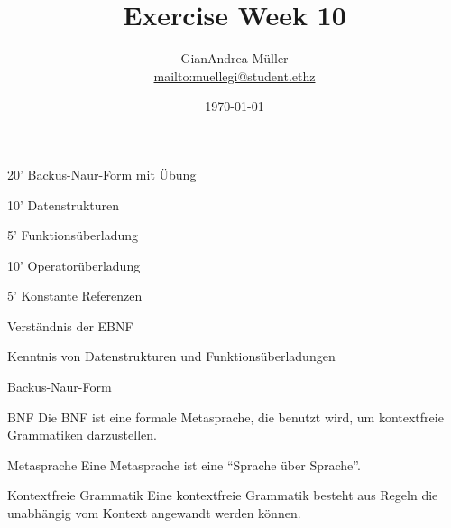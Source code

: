 \ifnum\conditionmacro=1 \documentclass[handout,usenames,dvipsnames]{beamer}\fi
\title{Exercise Week 10}
\author{GianAndrea Müller\\ \url{mailto:muellegi@student.ethz}}
\date{\today}
\begin{document}
\maketitle

\begin{TFTimeSchedule}
\item 20' Backus-Naur-Form mit Übung
\item 10' Datenstrukturen
\item 5' Funktionsüberladung
\item 10' Operatorüberladung
\item 5' Konstante Referenzen
\end{TFTimeSchedule}

\begin{TFLearningObjectives}
\item Verständnis der EBNF
\item Kenntnis von Datenstrukturen und Funktionsüberladungen
\end{TFLearningObjectives}

\begin{frame}{Backus-Naur-Form}

\begin{block}{BNF}
Die BNF ist eine formale Metasprache, die benutzt wird, um kontextfreie Grammatiken darzustellen.\\
\end{block}

\begin{block}{Metasprache}
Eine Metasprache ist eine ``Sprache über Sprache''.
\end{block}

\begin{block}{Kontextfreie Grammatik}
Eine kontextfreie Grammatik besteht aus Regeln die unabhängig vom Kontext angewandt werden können.
\end{block}

$\quad$$\quad$
\end{frame}
\end{document}
